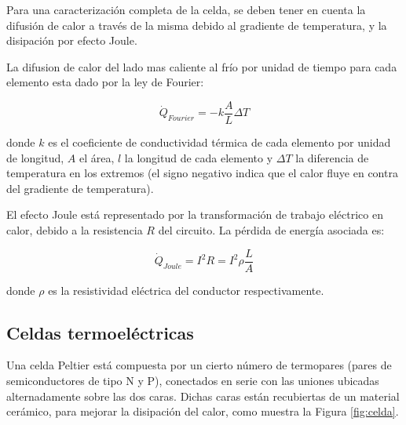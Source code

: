 \documentclass[twoside,twocolumn,a4paper]{article}
\begin{document}
Para una caracterizaci\'on completa de la celda, se deben tener en cuenta la difusi\'on de calor a trav\'es de la misma debido al gradiente de temperatura, y la disipaci\'on por efecto Joule.\newline

\par
La difusion de calor del lado mas caliente al fr\'io por unidad de tiempo para cada elemento esta dado por la ley de Fourier:

\begin{equation}
\label{eq:calor}
\dot{Q}_{Fourier} = -k \frac{A}{L} \Delta T
\end{equation}

donde $k$ es el coeficiente de conductividad t\'ermica de cada elemento por unidad de longitud, $A$ el \'area, $l$ la longitud de cada elemento y $\Delta T$ la diferencia de temperatura en los extremos (el signo negativo indica que el calor fluye en contra del gradiente de temperatura).\newline

\par
El efecto Joule est\'a representado por la transformaci\'on de trabajo el\'ectrico en calor, debido a la resistencia $R$ del circuito. La p\'erdida de energ\'ia asociada es:

\begin{equation}
\label{eq:joule}
\dot{Q}_{Joule} = I^{2}R = I^{2}\rho \frac{L}{A}
\end{equation}

donde $\rho$ es la resistividad el\'ectrica del conductor respectivamente.


\subsection{Celdas termoel\'ectricas}

Una celda Peltier est\'a compuesta por un cierto n\'umero de termopares (pares de semiconductores de tipo N y P), conectados en serie con las uniones ubicadas alternadamente sobre las dos caras. Dichas caras est\'an recubiertas de un material cer\'amico, para mejorar la disipaci\'on del calor, como muestra la Figura \ref{fig:celda}.
\end{document}
